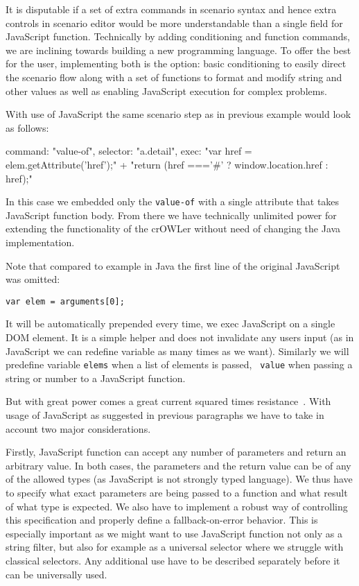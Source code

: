 It is disputable if a set of extra commands in scenario syntax and hence extra
controls in scenario editor would be more understandable than a single field
for JavaScript function. Technically by adding conditioning and function
commands, we are inclining towards building a new programming language. To
offer the best for the user, implementing both is the option: basic
conditioning to easily direct the scenario flow along with a set of functions
to format and modify string and other values as well as enabling JavaScript
execution for complex problems. 

With use of JavaScript the same scenario step as in previous example would look
as follows: 

\begtt
{
  command: "value-of", 
  selector: "a.detail", 
  exec: "var href = elem.getAttribute('href');" +
        "return (href ==='#' ? window.location.href : href);"
}
\endtt

In this case we embedded only the {\tt value-of} with a single attribute that
takes JavaScript function body. From there we have technically unlimited power
for extending the functionality of the crOWLer without need of changing the
Java implementation. 

Note that compared to example in Java the first line of the original JavaScript
was omitted: 

{\tt var elem = arguments[0];} 

It will be automatically prepended every time, we exec JavaScript on a single
DOM element. It is a simple helper and does not invalidate any users input (as
in JavaScript we can redefine variable as many times as we want). Similarly we
will predefine variable {\tt elems} when a list of elements is passed, {\tt
value} when passing a string or number to a JavaScript function. 

But with great power comes a great current squared times
resistance~. With usage of JavaScript as
suggested in previous paragraphs we have to take in account two major
considerations. 

Firstly, JavaScript function can accept any number of parameters and return an
arbitrary value. In both cases, the parameters and the return value can be
of any of the allowed types (as JavaScript is not strongly typed language). We
thus have to specify what exact parameters are being passed to a function and
what result of what type is expected. We also have to implement a robust way of
controlling this specification and properly define a fallback-on-error
behavior. This is especially important as we might want to use JavaScript
function not only as a string filter, but also for example as a universal
selector where we struggle with classical selectors. Any additional use have
to be described separately before it can be universally used. 

